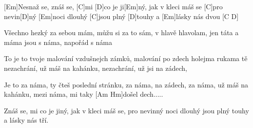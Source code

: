 
[Em]Nesnaž se, znáš se, 
[C] mi [D]co je ji[Em]ný, jak v kleci máš se [C]pro nevin[D]ný
[Em]noci dlouhý [C]jsou plný [D]touhy a [Em]lásky nás dvou [C D]

Všechno hezký za sebou mám, 
můžu si za to  sám, v hlavě hlavolam,
jen táta a máma jsou s náma, napořád s náma  

To je to tvoje malování vzdušnejch zámků, 
malování po zdech holejma rukama
tě nezachrání, už máš na kahánku, 
nezachrání, už jsi na zádech,

Je to za náma, ty čteš poslední stránku, 
za náma, na zádech, za náma,
už máš na kahánku, mezi náma, 
mi taky [Am Hm]došel dech.....

Znáš se,  mi co je jiný, 
jak v kleci máš se, pro nevinný
noci dlouhý jsou plný touhy a lásky nás tří.